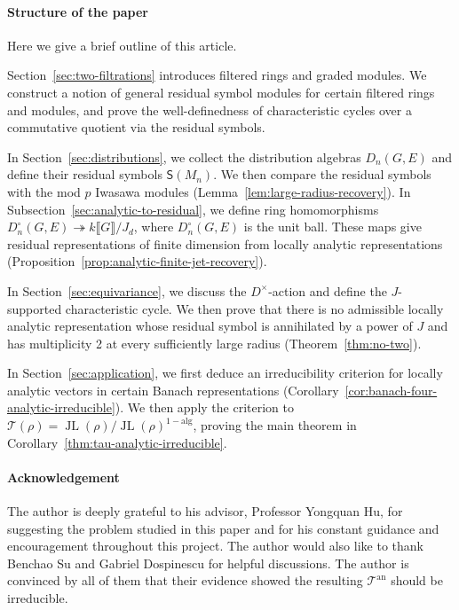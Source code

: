 \documentclass[11pt]{article}
\theoremstyle{definition}
\newcommand{\JL}{\operatorname{JL}}
\newcommand{\Tau}{\mathcal T}
\begin{document}
\paragraph{Structure of the paper}Here we give a brief outline of this article. 

Section~\ref{sec:two-filtrations} introduces filtered rings and
graded modules. We construct a notion of general residual symbol modules for certain filtered rings and modules,
and prove the well-definedness of characteristic cycles over a commutative quotient via the residual symbols.

In Section~\ref{sec:distributions}, we collect the distribution
algebras $D_n(G,E)$ and define their residual symbols
$\mathsf S(M_n)$. We then compare the residual symbols with the mod $p$ Iwasawa modules (Lemma~\ref{lem:large-radius-recovery}).
In Subsection~\ref{sec:analytic-to-residual}, we define ring homomorphisms
$D_n^\circ(G,E)\twoheadrightarrow k\llbracket G\rrbracket/J_d$,
where $D_n^\circ(G,E)$ is the unit ball. These maps give residual
representations of finite dimension from locally analytic representations (Proposition~\ref{prop:analytic-finite-jet-recovery}).

In Section~\ref{sec:equivariance}, we discuss the $D^\times$-action
and define the $J$-supported characteristic cycle. We then prove that
there is no admissible locally analytic representation whose 
residual symbol is annihilated by a power of $J$ and has
multiplicity 2 at every sufficiently large radius (Theorem~\ref{thm:no-two}). 

In Section~\ref{sec:application}, we first deduce an irreducibility
criterion for locally analytic vectors in certain Banach representations (Corollary~\ref{cor:banach-four-analytic-irreducible}).
We then apply the criterion to $\Tau(\rho)=\JL(\rho)/\JL(\rho)^{1-\mathrm{alg}}$, 
proving the main theorem in Corollary~\ref{thm:tau-analytic-irreducible}.

\paragraph{Acknowledgement} 
The author is deeply grateful to his advisor, Professor Yongquan Hu, for suggesting the problem studied in this paper and for his constant guidance and encouragement throughout this project. 
The author would also like to thank Benchao Su and Gabriel Dospinescu for helpful discussions. 
The author is convinced by all of them that their evidence showed the resulting $\Tau^{\mathrm{an}}$ should be irreducible.
\end{document}
